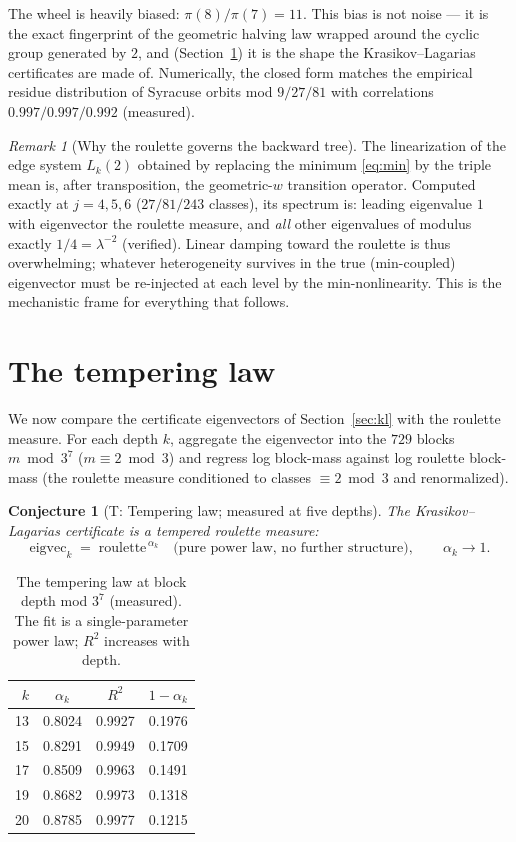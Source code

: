 \documentclass[11pt]{article}
\newtheorem{conjecture}[theorem]{Conjecture}
\theoremstyle{definition}
\theoremstyle{remark}
\newtheorem{remark}[theorem]{Remark}
\newcommand{\lam}{\lambda}
\begin{document}
The wheel is heavily biased: $\pi(8)/\pi(7) = 11$. This bias is not noise ---
it is the exact fingerprint of the geometric halving law wrapped around the
cyclic group generated by $2$, and (Section~\ref{sec:tempering}) it is the
shape the Krasikov--Lagarias certificates are made of. Numerically, the closed
form matches the empirical residue distribution of Syracuse orbits mod
$9/27/81$ with correlations $0.997/0.997/0.992$ (measured).

\begin{remark}[Why the roulette governs the backward tree]\label{rem:linear}
The linearization of the edge system $L_k(2)$ obtained by replacing the minimum
\eqref{eq:min} by the triple mean is, after transposition, the geometric-$w$
transition operator. Computed exactly at $j = 4, 5, 6$ ($27/81/243$ classes),
its spectrum is: leading eigenvalue $1$ with eigenvector the roulette measure,
and \emph{all} other eigenvalues of modulus exactly $1/4 = \lam^{-2}$
(verified). Linear damping toward the roulette is thus overwhelming; whatever
heterogeneity survives in the true (min-coupled) eigenvector must be
re-injected at each level by the min-nonlinearity. This is the mechanistic
frame for everything that follows.
\end{remark}

\section{The tempering law}
\label{sec:tempering}

We now compare the certificate eigenvectors of Section~\ref{sec:kl} with the
roulette measure. For each depth $k$, aggregate the eigenvector into the $729$
blocks $m \bmod 3^7$ ($m \equiv 2 \bmod 3$) and regress log block-mass against
log roulette block-mass (the roulette measure conditioned to classes
$\equiv 2 \bmod 3$ and renormalized).

\begin{conjecture}[T: Tempering law; measured at five depths]\label{conj:T}
The Krasikov--Lagarias certificate is a tempered roulette measure:
\[
\mathrm{eigvec}_k \;=\; \mathrm{roulette}^{\,\alpha_k}
\quad\text{(pure power law, no further structure)},
\qquad \alpha_k \longrightarrow 1 .
\]
\end{conjecture}

\begin{table}[ht]
\centering
\begin{tabular}{r c c c}
\hline
$k$ & $\alpha_k$ & $R^2$ & $1 - \alpha_k$ \\
\hline
13 & 0.8024 & 0.9927 & 0.1976 \\
15 & 0.8291 & 0.9949 & 0.1709 \\
17 & 0.8509 & 0.9963 & 0.1491 \\
19 & 0.8682 & 0.9973 & 0.1318 \\
20 & 0.8785 & 0.9977 & 0.1215 \\
\hline
\end{tabular}
\caption{The tempering law at block depth mod $3^7$ (measured). The fit is a
single-parameter power law; $R^2$ increases with depth.}
\label{tab:tempering}
\end{table}
\end{document}

